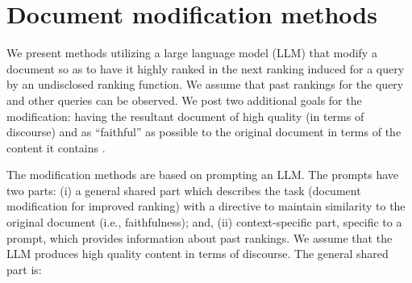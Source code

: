 \section{Document modification methods}
\label{sec:bots}


We present methods utilizing a large language model (LLM) that
modify a document so as to have it highly ranked in the next ranking induced
for a query by an undisclosed ranking function. We assume that past rankings for
the query and other queries can be observed. We post two additional
goals for the modification: having the resultant document of high
quality (in terms of discourse) and as ``faithful'' as possible to the original document in terms of the
content it contains \cite{goren2020ranking}.

The modification methods are based on prompting an LLM. The prompts have two parts: (i) a general shared part which
describes the task (document modification for improved ranking) with a
directive to maintain similarity to the original document (i.e.,
faithfulness); and, (ii) context-specific part, specific to a prompt, which provides information about past rankings. We assume that the LLM produces high quality content in terms of discourse. The general shared part is:

%









